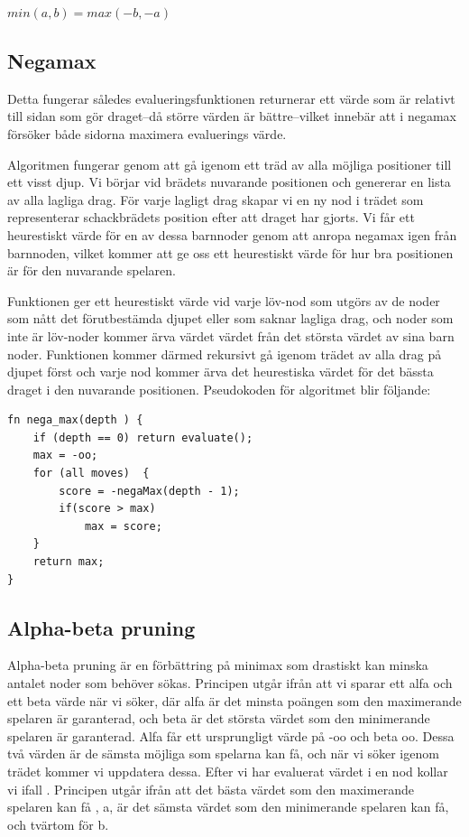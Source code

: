 \documentclass{article}
\begin{document}
\begin{math}
min(a,b)=max(-b,-a)
\end{math}

\subsection{Negamax}
Detta fungerar således evalueringsfunktionen returnerar ett värde som är relativt till sidan som gör draget--då större värden är bättre--vilket innebär att i negamax försöker både sidorna maximera evaluerings värde. 

Algoritmen fungerar genom att gå igenom ett träd av alla möjliga positioner till ett visst djup. Vi börjar vid brädets nuvarande positionen och genererar en lista av alla lagliga drag. För varje lagligt drag skapar vi en ny nod i trädet som representerar schackbrädets position efter att draget har gjorts. Vi får ett heurestiskt värde för en av dessa barnnoder genom att anropa negamax igen från barnnoden, vilket kommer att ge oss ett heurestiskt värde för hur bra positionen är för den nuvarande spelaren. 

Funktionen ger ett heurestiskt värde vid varje löv-nod som utgörs av de noder som nått det förutbestämda djupet eller som saknar lagliga drag, och noder som inte är löv-noder kommer ärva värdet värdet från det största värdet av sina barn noder. Funktionen kommer därmed rekursivt gå igenom trädet av alla drag på djupet först och varje nod kommer ärva det heurestiska värdet för det bässta draget i den nuvarande positionen.
Pseudokoden för algoritmet blir följande:

\begin{verbatim}
fn nega_max(depth ) {
    if (depth == 0) return evaluate();
    max = -oo;
    for (all moves)  {
        score = -negaMax(depth - 1);
        if(score > max)
            max = score;
    }
    return max;
}
\end{verbatim}

\subsection{Alpha-beta pruning}
Alpha-beta pruning är en förbättring på minimax som drastiskt kan minska antalet noder som behöver sökas. Principen utgår ifrån att vi sparar ett alfa och ett beta värde när vi söker, där alfa är det minsta poängen som den maximerande spelaren är garanterad, och beta är det största värdet som den minimerande spelaren är garanterad. Alfa får ett ursprungligt värde på -oo och beta oo. Dessa två värden är de sämsta möjliga som spelarna kan få, och när vi söker igenom trädet kommer vi uppdatera dessa. Efter vi har evaluerat värdet i en nod kollar vi ifall . Principen utgår ifrån att det bästa värdet som den maximerande spelaren kan få , a, är det sämsta värdet som den minimerande spelaren kan få, och tvärtom för b.
\end{document}
